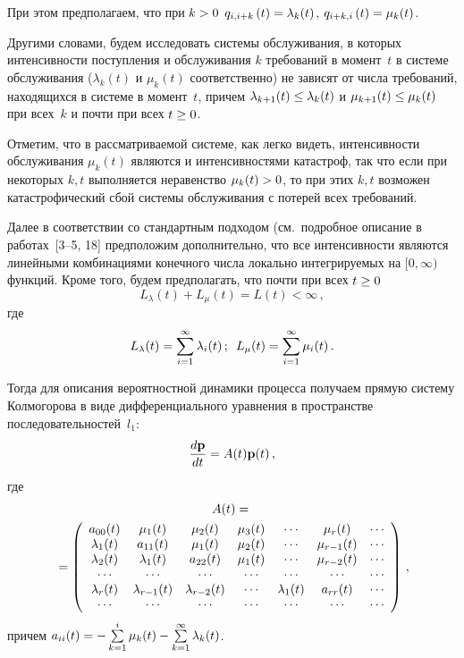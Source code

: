 \begin{multicols}{2}
При этом предполагаем, что при $k\hm>0$ $q_{i,i+k}\left( t\right)
\hm=\lambda_k(t)$, $q_{i+k,i}\left( t\right) \hm= \mu_k(t)$.

Другими словами, будем исследовать системы обслуживания, 
в которых интенсивности поступления и обслуживания $k$ требований в момент~$t$ 
в системе обслуживания ($\lambda_{k}(t)$ и  $\mu_{k}(t)$ соответственно)  
не зависят от числа требований, находящихся в системе в момент~$t$, 
причем $\lambda_{k+1}(t) \hm\le \lambda_{k}(t)$ и  $\mu_{k+1}(t) \hm\le \mu_{k}(t)$ при всех~$k$ 
и почти при всех $t \hm\ge 0$.

Отметим, что в рассматриваемой системе, как легко видеть,  
интенсивности обслуживания $\mu_{k}(t)$ являются и интенсивностями катастроф, 
так что если при некоторых $k,t$ выполняется неравенство $\mu_{k}(t) \hm> 0$, то при этих $k,t$ 
возможен катастрофический сбой системы обслуживания с потерей всех требований.

Далее в соответствии со стандартным подходом (см.\ подробное описание
в работах~[3--5, 18] предположим дополнительно, что
все интенсивности являются линейными комбинациями конечного числа
локально интегрируемых на $[0,\infty)$ функций. Кроме того, будем
предполагать, что  почти при всех $t\hm\ge 0$
\begin{equation*}
L_{\lambda}(t)+L_{\mu}(t) =L(t) < \infty\,,
\end{equation*}
 где 
 \begin{equation*}
L_{\lambda}(t)=\sum\limits_{i=1}^{\infty}\lambda_i(t)\,;\enskip  
L_{\mu}(t)=\sum\limits_{i=1}^{\infty}\mu_i(t)\,.
\end{equation*}

Тогда для описания вероятностной динамики процесса получаем прямую систему 
Колмогорова в виде дифференциального уравнения в пространстве последовательностей~$l_1$:
\begin{equation} 
\label{ur01}
\displaystyle\frac{\displaystyle d{\mathbf p}\mathstrut}{\displaystyle dt\mathstrut}=A(t){\mathbf p}(t)\,,
\end{equation}
где
{\small %
\begin{multline*}
A(t)={}\\
{}=\left(
\begin{array}{cccccccc}
a_{00}(t) & \mu_1(t)  & \mu_2(t)   & \mu_3(t)  &  \cdots & \mu_r(t) & \cdots\\
\lambda_1(t)   & a_{11}(t)  & \mu_1(t)  & \mu_2(t)   &  \cdots & \mu_{r-1}(t) & \cdots\\
\lambda_2(t)  & \lambda_1(t)    & a_{22}(t)& \mu_1(t)  &   \cdots & \mu_{r-2}(t) & \cdots\\
\cdots &\cdots&\cdots&\cdots&\cdots&\cdots&\cdots\\
\lambda_r(t) & \lambda_{r-1}(t) & \lambda_{r-2}(t) & \cdots &  \lambda_1 (t)   &  a_{rr}(t) & \cdots\\
\cdots &\cdots&\cdots&\cdots&\cdots&\cdots&\cdots\\
\end{array}
\right)\,,
\end{multline*}
}
причем  $a_{ii}(t)=-\sum\limits_{k=1}^{i}\mu_k(t) \hm- \sum\limits_{k=1}^{\infty} \la_{k}(t)$.


\end{multicols}
